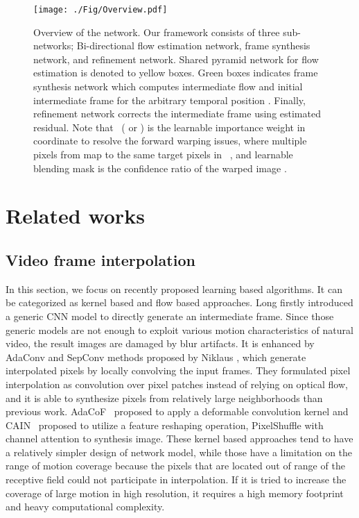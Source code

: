 \documentclass[10pt,twocolumn,letterpaper]{article}
\begin{document}
\begin{figure*}
\centering
\texttt{[image: ./Fig/Overview.pdf]}
\caption{Overview of the network. 
Our framework consists of three sub-networks; Bi-directional flow estimation network, frame synthesis network, and refinement network. 
Shared pyramid network for flow estimation is denoted to yellow boxes. 
Green boxes indicates frame synthesis network which computes intermediate flow and initial intermediate frame for the arbitrary temporal position . 
Finally, refinement network corrects the intermediate frame using estimated residual. 
Note that ~( or ) is the learnable importance weight in  coordinate to resolve the forward warping issues, where multiple pixels from  map to the same target pixels in ~\cite{niklaus2020softmax}, and learnable blending mask  is the confidence ratio of the warped image . 
}
\label{fig:overview}
\end{figure*}
\section{Related works}

\subsection{Video frame interpolation}
In this section, we focus on recently proposed learning based algorithms. It can be categorized as kernel based and flow based approaches. Long \etal\cite{long2016learning} firstly introduced a generic CNN model to directly generate an intermediate frame. Since those generic models are not enough to exploit various motion characteristics of natural video, the result images are damaged by blur artifacts.
It is enhanced by AdaConv and SepConv methods proposed by Niklaus \etal\cite{niklaus2017video}, which generate interpolated pixels by locally convolving the input frames.
They formulated pixel interpolation as convolution over pixel patches instead of relying on optical flow, and it is able to synthesize pixels from relatively large neighborhoods than previous work. AdaCoF~\cite{lee2020adacof} proposed to apply a deformable convolution kernel and CAIN~\cite{choi2020channel} proposed to utilize a feature reshaping operation, PixelShuffle with channel attention to synthesis image. These kernel based approaches tend to have a relatively simpler design of network model, while those have a limitation on the range of motion coverage because the pixels that are located out of range of the receptive field could not participate in interpolation. If it is tried to increase the coverage of large motion in high resolution, it requires a high memory footprint and heavy computational complexity.
\end{document}
